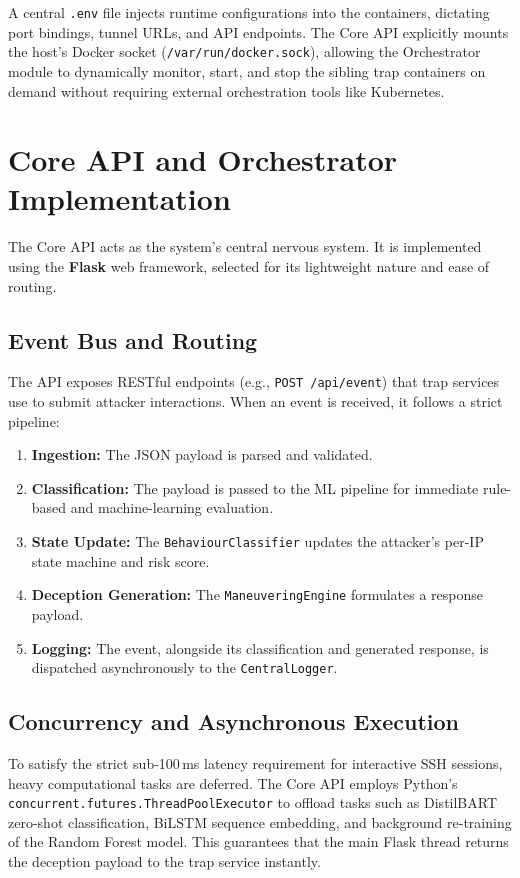 A central \texttt{.env} file injects runtime configurations into the containers, dictating port bindings, tunnel URLs, and API endpoints. The Core API explicitly mounts the host's Docker socket (\texttt{/var/run/docker.sock}), allowing the Orchestrator module to dynamically monitor, start, and stop the sibling trap containers on demand without requiring external orchestration tools like Kubernetes.

\section{Core API and Orchestrator Implementation}

The Core API acts as the system's central nervous system. It is implemented using the \textbf{Flask} web framework, selected for its lightweight nature and ease of routing.

\subsection{Event Bus and Routing}
The API exposes RESTful endpoints (e.g., \texttt{POST /api/event}) that trap services use to submit attacker interactions. When an event is received, it follows a strict pipeline:
\begin{enumerate}
    \item \textbf{Ingestion:} The JSON payload is parsed and validated.
    \item \textbf{Classification:} The payload is passed to the ML pipeline for immediate rule-based and machine-learning evaluation.
    \item \textbf{State Update:} The \texttt{BehaviourClassifier} updates the attacker's per-IP state machine and risk score.
    \item \textbf{Deception Generation:} The \texttt{ManeuveringEngine} formulates a response payload.
    \item \textbf{Logging:} The event, alongside its classification and generated response, is dispatched asynchronously to the \texttt{CentralLogger}.
\end{enumerate}

\subsection{Concurrency and Asynchronous Execution}
To satisfy the strict sub-100\,ms latency requirement for interactive \ac{SSH} sessions, heavy computational tasks are deferred. The Core API employs Python's \texttt{concurrent.futures.ThreadPoolExecutor} to offload tasks such as DistilBART zero-shot classification, BiLSTM sequence embedding, and background re-training of the Random Forest model. This guarantees that the main Flask thread returns the deception payload to the trap service instantly.

